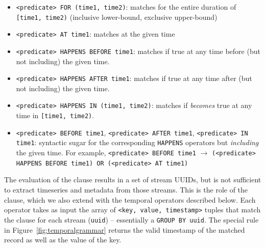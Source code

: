 \begin{itemize}
\item \texttt{<predicate> FOR (time1, time2)}: matches 
for the entire duration of \texttt{[time1, time2)} (inclusive lower-bound, exclusive upper-bound)

\item \texttt{<predicate> AT time1}: matches  at the given time

\item \texttt{<predicate> HAPPENS BEFORE time1}: matches if  true at any time before (but not including)
the given time.

\item \texttt{<predicate> HAPPENS AFTER time1}: matches if  true at any time after (but not including)
the given time.

\item \texttt{<predicate> HAPPENS IN (time1, time2)}: matches if  \emph{becomes} true at any time in \texttt{[time1, time2)}.

\item \texttt{<predicate> BEFORE time1}, \texttt{<predicate> AFTER time1}, \texttt{<predicate> IN time1}: syntactic sugar for the corresponding
\texttt{HAPPENS} operators but \emph{including} the given time. For example, \texttt{<predicate> BEFORE time1} $\rightarrow$ \texttt{(<predicate>
HAPPENS BEFORE time1) OR (<predicate> AT time1)}
\end{itemize}

The evaluation of the  clause results in a set of stream UUIDs,
but is not sufficient to extract timeseries and metadata from those streams.
This is the role of the  clause, which we also extend with the
temporal operators described below. Each  operator takes as
input the array of \texttt{<key, value, timestamp>} tuples that match the
 clause for each stream (\texttt{uuid}) -- essentially a
\texttt{GROUP BY uuid}.  The special rule  in Figure~\ref{fig:temporalgrammar} returns the valid timestamp of the
matched record as well as the value of the key.

